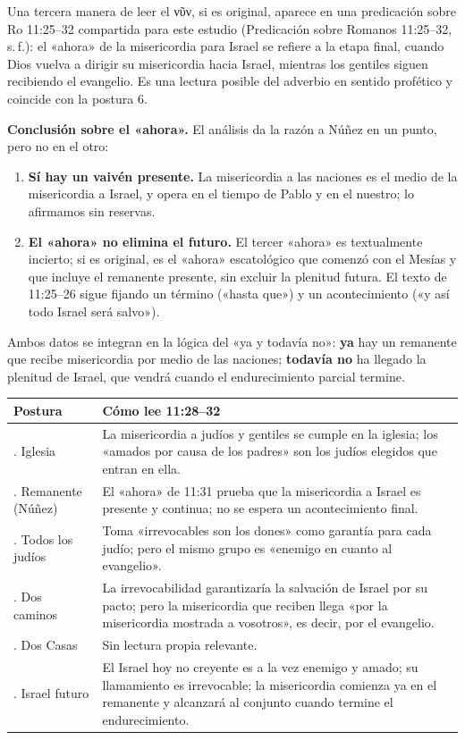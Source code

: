 \documentclass[11pt,letterpaper]{article}
\newcommand{\grc}[1]{\foreignlanguage{ancientgreek}{#1}}
\newcommand{\destacar}[1]{\textbf{\textcolor{ladrillo}{#1}}}
\begin{document}
Una tercera manera de leer el \grc{νῦν}, si es original, aparece en una predicación sobre Ro 11:25--32 compartida para este estudio (Predicación sobre Romanos 11:25--32, s.\,f.): el «ahora» de la misericordia para Israel se refiere a la etapa final, cuando Dios vuelva a dirigir su misericordia hacia Israel, mientras los gentiles siguen recibiendo el evangelio. Es una lectura posible del adverbio en sentido profético y coincide con la postura 6.

\textbf{Conclusión sobre el «ahora».} El análisis da la razón a Núñez en un punto, pero no en el otro:
\begin{enumerate}
\item \textbf{Sí hay un vaivén presente.} La misericordia a las naciones es el medio de la misericordia a Israel, y opera en el tiempo de Pablo y en el nuestro; lo afirmamos sin reservas.
\item \textbf{El «ahora» no elimina el futuro.} El tercer «ahora» es textualmente incierto; si es original, es el «ahora» escatológico que comenzó con el Mesías y que incluye el remanente presente, sin excluir la plenitud futura. El texto de 11:25--26 sigue fijando un término («hasta que») y un acontecimiento («y así todo Israel será salvo»).
\end{enumerate}
Ambos datos se integran en la lógica del «ya y todavía no»: \destacar{ya} hay un remanente que recibe misericordia por medio de las naciones; \destacar{todavía no} ha llegado la plenitud de Israel, que vendrá cuando el endurecimiento parcial termine.

\begin{center}\footnotesize
\renewcommand{\arraystretch}{1.25}
\begin{tabular}{>{\RaggedRight\arraybackslash}p{2.9cm}>{\RaggedRight\arraybackslash}p{11.1cm}}
\toprule
\textbf{Postura} & \textbf{Cómo lee 11:28--32}\\
\midrule
1. Iglesia & La misericordia a judíos y gentiles se cumple en la iglesia; los «amados por causa de los padres» son los judíos elegidos que entran en ella.\\
2. Remanente (Núñez) & El «ahora» de 11:31 prueba que la misericordia a Israel es presente y continua; no se espera un acontecimiento final.\\
3. Todos los judíos & Toma «irrevocables son los dones» como garantía para cada judío; pero el mismo grupo es «enemigo en cuanto al evangelio».\\
4. Dos caminos & La irrevocabilidad garantizaría la salvación de Israel por su pacto; pero la misericordia que reciben llega «por la misericordia mostrada a vosotros», es decir, por el evangelio.\\
5. Dos Casas & Sin lectura propia relevante.\\
6. Israel futuro & El Israel hoy no creyente es a la vez enemigo y amado; su llamamiento es irrevocable; la misericordia comienza ya en el remanente y alcanzará al conjunto cuando termine el endurecimiento.\\
\bottomrule
\end{tabular}\end{center}
\end{document}
